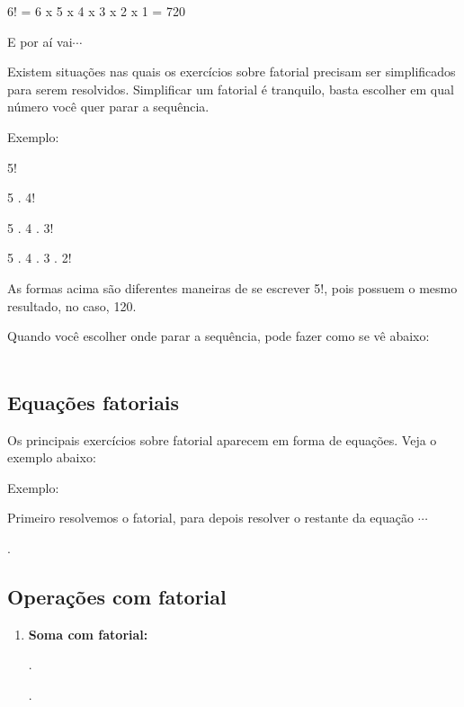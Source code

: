 \begin{multicols*}{2}
6! = 6 x 5 x 4 x 3 x 2 x 1 = 720

E por aí vai$\cdots$

Existem situações nas quais os exercícios sobre fatorial precisam ser simplificados para serem resolvidos. Simplificar um fatorial é tranquilo, basta escolher em qual número você quer parar a sequência.

Exemplo:

5!

5 . 4!

5 . 4 . 3!

5 . 4 . 3 . 2!

As formas acima são diferentes maneiras de se escrever 5!, pois possuem o mesmo resultado, no caso, 120.

Quando você escolher onde parar a sequência, pode fazer como se vê abaixo:\\

 \\


\subsection{Equações fatoriais}

Os principais exercícios sobre fatorial aparecem em forma de equações. Veja o exemplo abaixo:

Exemplo: 

Primeiro resolvemos o fatorial, para depois resolver o restante da equação $\cdots $



.

\subsection{Operações com fatorial}

	\begin{enumerate}

	\item \textbf{Soma com fatorial:}
	
	.
	
	.
	

\end{enumerate}
\end{multicols*}
